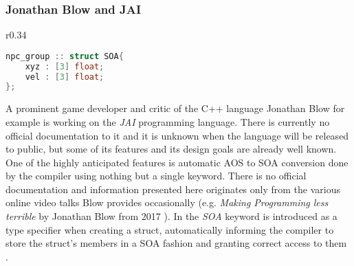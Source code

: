 \subsubsection{Jonathan Blow and JAI}
\begin{wrapfigure}[6]{r}{0.34\textwidth}
\vspace{-0.8cm}
\begin{lstlisting}[language=C++,name={JAI's native SOA support},morekeywords={SOA}, label={jai_npc}]
npc_group :: struct SOA{
	xyz : [3] float;
	vel : [3] float;
};
\end{lstlisting}
\end{wrapfigure}
A prominent game developer and critic of the C++ language Jonathan Blow for example is working on the \textit{JAI} programming language. There is currently no official documentation to it and it is unknown when the language will be released to public, but some of its features and its design goals are already well known. One of the highly anticipated features is automatic AOS to SOA conversion done by the compiler using nothing but a single keyword. There is no official documentation and information presented here originates only from the various online video talks Blow provides occasionally (e.g. \textit{Making Programming less terrible} by Jonathan Blow from 2017 ). In  the \textit{SOA} keyword is introduced as a type specifier when creating a struct, automatically informing the compiler to store the struct's members in a SOA fashion and granting correct access to them .

